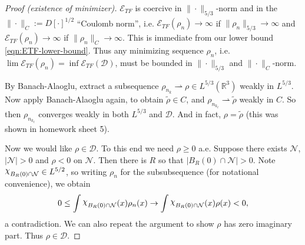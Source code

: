 \documentclass[11pt]{amsart}
\newcommand{\R}{\mathbb{R}}
\DeclareRobustCommand{\Chi}{{\mathpalette\irchi\relax}}
\newcommand{\irchi}[2]{\raisebox{\depth}{$#1\chi$}} %
\renewcommand{\tilde}{\widetilde}
\renewcommand{\tilde}{\widetilde}
\theoremstyle{definition}
\theoremstyle{definition}
\theoremstyle{definition}
\numberwithin{equation}{section}
\begin{document}
\begin{proof}[Proof (existence of minimizer)]
$\mathcal{E}_{TF}$ is coercive in $\|\cdot\|_{5/3}$-norm and in the $\|\cdot\|_C:=D[\cdot]^{1/2}$ ``Coulomb norm'', i.e. $\mathcal{E}_{TF}(\rho_n)\to\infty$ if $\|\rho_n\|_{5/3}\to\infty$ and $\mathcal{E}_{TF}(\rho_n)\to\infty$ if $\|\rho_n\|_C\to\infty$. This is immediate from our lower bound \eqref{eqn:ETF-lower-bound}. Thus any minimizing sequence $\rho_n$, i.e. $\lim\mathcal{E}_{TF}(\rho_n)=\inf\mathcal{E}_{TF}(\mathcal{D})$, must be bounded in $\|\cdot\|_{5/3}$ and $\|\cdot\|_C$-norm.

By Banach-Alaoglu, extract a subsequence $\rho_{n_k}\rightharpoonup\rho\in L^{5/3}(\R^3)$ weakly in $L^{5/3}$. Now apply Banach-Alaoglu again, to obtain $\tilde{\rho}\in C$, and $\rho_{n_{k_\ell}}\rightharpoonup\tilde{\rho}$ weakly in $C$. So then $\rho_{n_{k_\ell}}$ converges weakly in both $L^{5/3}$ and $\mathcal{D}$. And in fact, $\rho=\tilde{\rho}$ (this was shown in homework sheet 5). %

Now we would like $\rho\in\mathcal{D}$. To this end we need $\rho\ge0$ a.e. Suppose there exists $\mathcal{N}$, $|\mathcal{N}|>0$ and $\rho<0$ on $\mathcal{N}$. Then there is $R$ so that $|B_R(0)\cap\mathcal{N}|>0$. Note $\Chi_{B_R(0)\cap\mathcal{N}}\in L^{5/2}$, so writing $\rho_n$ for the subsubsequence (for notational convenience), we obtain
\[
0\le\int\Chi_{B_R(0)\cap\mathcal{N}}(x)\rho_n(x)\to\int \Chi_{B_R(0)\cap\mathcal{N}}(x)\rho(x)<0,
\]
a contradiction. We can also repeat the argument to show $\rho$ has zero imaginary part. %
Thus $\rho\in\mathcal{D}$.


\end{proof}
\end{document}
